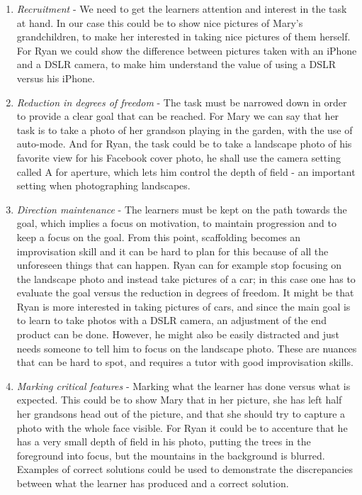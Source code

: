 \begin{enumerate}
\item{} \emph{Recruitment} - We need to get the learners attention and interest in the task at hand. In our case this could be to show nice pictures of Mary's grandchildren, to make her interested in taking nice pictures of them herself. For Ryan we could show the difference between pictures taken with an iPhone and a DSLR camera, to make him understand the value of using a DSLR versus his iPhone.
\item{} \emph{Reduction in degrees of freedom} - The task must be narrowed down in order to provide a clear goal that can be reached. For Mary we can say that her task is to take a photo of her grandson playing in the garden, with the use of auto-mode. And for Ryan, the task could be to take a landscape photo of his favorite view for his Facebook cover photo, he shall use the camera setting called A for aperture, which lets him control the depth of field - an important setting when photographing landscapes. 
\item{} \emph{Direction maintenance} - The learners must be kept on the path towards the goal, which implies a focus on motivation, to maintain progression and to keep a focus on the goal. From this point, scaffolding becomes an improvisation skill and it can be hard to plan for this because of all the unforeseen things that can happen. Ryan can for example stop focusing on the landscape photo and instead take pictures of a car; in this case one has to evaluate the goal versus the reduction in degrees of freedom. It might be that Ryan is more interested in taking pictures of cars, and since the main goal is to learn to take photos with a DSLR camera, an adjustment of the end product can be done. However, he might also be easily distracted and just needs someone to tell him to focus on the landscape photo. These are nuances that can be hard to spot, and requires a tutor with good improvisation skills.
\item{} \emph{Marking critical features} - Marking what the learner has done versus what is expected. This could be to show Mary that in her picture, she has left half her grandsons head out of the picture, and that she should try to capture a photo with the whole face visible. For Ryan it could be to accenture that he has a very small depth of field in his photo, putting the trees in the foreground into focus, but the mountains in the background is blurred. Examples of correct solutions could be used to demonstrate the discrepancies between what the learner has produced and a correct solution.

\end{enumerate}
